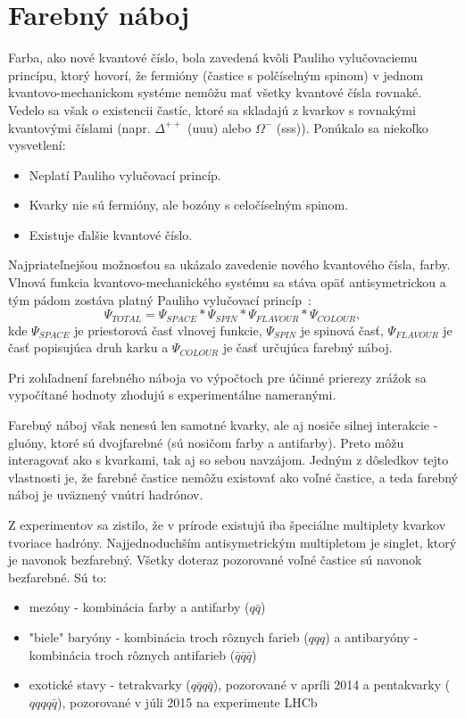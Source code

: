 \documentclass[thesismargins, thesislinespacing]{rnthesis}
\begin{document}
\section{Farebný náboj}
 Farba, ako nové kvantové číslo, bola zavedená kvôli Pauliho vylučovaciemu princípu, ktorý hovorí, že fermióny (častice s polčíselným spinom) v jednom kvantovo-me\-cha\-nic\-kom systéme nemôžu mať všetky kvantové čísla rovnaké. Vedelo sa však o existencii častíc, ktoré sa skladajú z kvarkov s rovnakými kvantovými číslami (napr. $\Delta^{++}$ (uuu) alebo $\Omega^{-}$ (sss)). Ponúkalo sa niekoľko vysvetlení:
\begin{itemize}
	\item Neplatí Pauliho vylučovací princíp.
	\item Kvarky nie sú fermióny, ale bozóny s celočíselným spinom.
	\item Existuje ďalšie kvantové číslo.
\end{itemize}
Najpriateľnejšou možnosťou sa ukázalo zavedenie nového kvantového čísla, farby. Vlnová funkcia kvantovo-mechanického systému sa stáva opäť antisymetrickou a tým pádom zostáva platný Pauliho vylučovací princíp~\cite{1}:
\begin{equation}
\Psi_{TOTAL}=\Psi_{SPACE}*\Psi_{SPIN}*\Psi_{FLAVOUR}*\Psi_{COLOUR}, 
\end{equation}   
kde $\Psi_{SPACE}$ je priestorová časť vlnovej funkcie, $\Psi_{SPIN}$ je spinová časť, $\Psi_{FLAVOUR}$ je časť popisujúca druh karku a $\Psi_{COLOUR}$ je časť určujúca farebný náboj.

Pri zohľadnení farebného náboja vo výpočtoch pre účinné prierezy zrážok sa vy\-po\-čí\-ta\-né hodnoty zhodujú s experimentálne nameranými.

Farebný náboj však nenesú len samotné kvarky, ale aj nosiče silnej interakcie - gluóny, ktoré sú dvojfarebné (sú nosičom farby a antifarby). Preto môžu interagovať ako s kvarkami, tak aj so sebou navzájom. Jedným z dôsledkov tejto vlastnosti je, že farebné častice nemôžu existovať ako voľné častice, a teda farebný náboj je uväznený vnútri hadrónov.

Z experimentov sa zistilo, že v prírode existujú iba špeciálne multiplety kvarkov tvoriace hadróny. Najjednoduchším antisymetrickým multipletom je singlet, ktorý je navonok bezfarebný. Všetky doteraz pozorované voľné častice sú navonok bezfarebné. Sú to:
\begin{itemize}
	\item mezóny - kombinácia farby a antifarby ($q \bar q$)
	\item "biele" baryóny - kombinácia troch rôznych farieb ($qqq$) a antibaryóny - kombinácia troch rôznych antifarieb ($\bar q \bar q \bar q$)
	\item exotické stavy - tetrakvarky ($q \bar q q \bar q$), pozorované v apríli 2014 \cite{tetra} a pentakvarky ($qqqq \bar q $), pozorované v júli 2015 na experimente LHCb \cite{2}
\end{itemize}
\end{document}
